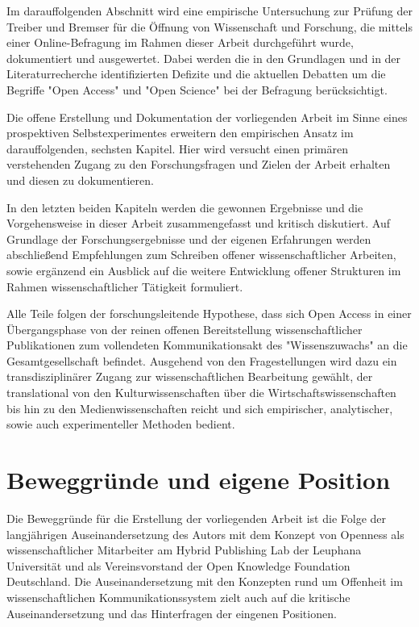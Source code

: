 Im darauffolgenden Abschnitt wird eine empirische Untersuchung zur Prüfung der Treiber und Bremser für die Öffnung von Wissenschaft und Forschung, die mittels einer Online-Befragung im Rahmen dieser Arbeit durchgeführt wurde, dokumentiert und ausgewertet. Dabei werden die in den Grundlagen und in der Literaturrecherche identifizierten Defizite und die aktuellen Debatten um die Begriffe "Open Access" und "Open Science" bei der Befragung berücksichtigt.

Die offene Erstellung und Dokumentation der vorliegenden Arbeit im Sinne eines prospektiven Selbstexperimentes erweitern den empirischen Ansatz im darauffolgenden, sechsten Kapitel. Hier wird versucht einen primären verstehenden Zugang zu den Forschungsfragen und Zielen der Arbeit erhalten und diesen zu dokumentieren.

In den letzten beiden Kapiteln werden die gewonnen Ergebnisse und die Vorgehensweise in dieser Arbeit zusammengefasst und kritisch diskutiert. Auf Grundlage der Forschungsergebnisse und der eigenen Erfahrungen werden abschließend Empfehlungen zum Schreiben offener wissenschaftlicher Arbeiten, sowie ergänzend ein Ausblick auf die weitere Entwicklung offener Strukturen im Rahmen wissenschaftlicher Tätigkeit formuliert.

Alle Teile folgen der forschungsleitende Hypothese, dass sich Open Access in einer Übergangsphase von der reinen offenen Bereitstellung wissenschaftlicher Publikationen zum vollendeten Kommunikationsakt des "Wissenszuwachs" \cite{Luhmann1998} an die Gesamtgesellschaft befindet. Ausgehend von den Fragestellungen wird dazu ein transdisziplinärer Zugang zur wissenschaftlichen Bearbeitung gewählt, der translational von den Kulturwissenschaften über die Wirtschaftswissenschaften bis hin zu den Medienwissenschaften reicht und sich empirischer, analytischer, sowie auch experimenteller Methoden bedient.

\section{Beweggründe und eigene Position}

Die Beweggründe für die Erstellung der vorliegenden Arbeit ist die Folge der langjährigen Auseinandersetzung des Autors mit dem Konzept von Openness als wissenschaftlicher Mitarbeiter am Hybrid Publishing Lab der Leuphana Universität und als Vereinsvorstand der Open Knowledge Foundation Deutschland. Die Auseinandersetzung mit den Konzepten rund um Offenheit im wissenschaftlichen Kommunikationssystem zielt auch auf die kritische Auseinandersetzung und das Hinterfragen der eingenen Positionen.

